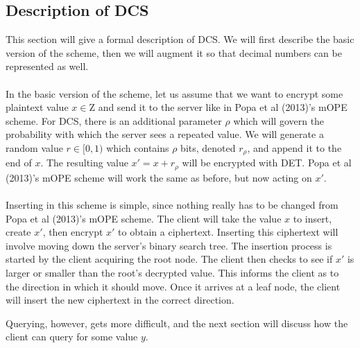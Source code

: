 \documentclass[12pt]{article}
\begin{document}
\subsection{Description of DCS}
This section will give a formal description of DCS. We will first describe the basic version of the scheme, then we will augment it so that decimal numbers can be represented as well. \\ \\
In the basic version of the scheme, let us assume that we want to encrypt some plaintext value $x \in \mathrm{Z}$ and send it to the server like in Popa et al (2013)'s mOPE scheme. For DCS, there is an additional parameter $\rho$ which will govern the probability with which the server sees a repeated value. We will generate a random value $r \in [0,1)$ which contains $\rho$ bits, denoted $r_{\rho}$, and append it to the end of $x$. The resulting value $x' = x + r_{\rho}$ will be encrypted with DET. Popa et al (2013)'s mOPE scheme will work the same as before, but now acting on $x'$. \\ \\
Inserting in this scheme is simple, since nothing really has to be changed from Popa et al (2013)'s mOPE scheme. The client will take the value $x$ to insert, create $x'$, then encrypt $x'$ to obtain a ciphertext. Inserting this ciphertext will involve moving down the server's binary search tree. The insertion process is started by the client acquiring the root node. The client then checks to see if $x'$ is larger or smaller than the root's decrypted value. This informs the client as to the direction in which it should move. Once it arrives at a leaf node, the client will insert the new ciphertext in the correct direction.
\begin{figure}
\end{figure}
Querying, however, gets more difficult, and the next section will discuss how the client can query for some value $y$. 
\end{document}
